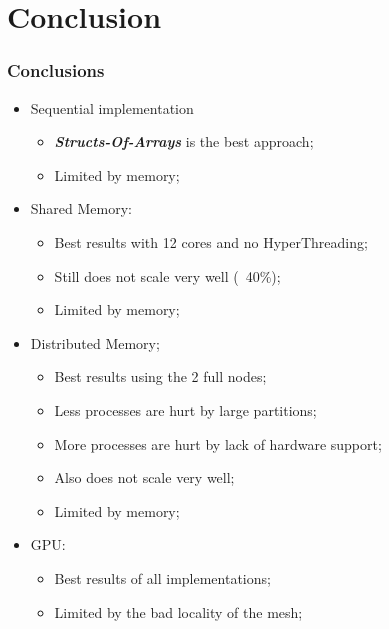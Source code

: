 \section{Conclusion}

\begin{frame}
	\frametitle{Conclusions}

	\begin{itemize}
		\item Sequential implementation
		\begin{itemize}
			\item \textbf{\itshape Structs-Of-Arrays} is the best approach;
			\item Limited by memory;
		\end{itemize}
		\item Shared Memory:
		\begin{itemize}
			\item Best results with 12 cores and no HyperThreading;
			\item Still does not scale very well (~40\%);
			\item Limited by memory;
		\end{itemize}
		\item Distributed Memory;
		\begin{itemize}
			\item Best results using the 2 full nodes;
			\item Less processes are hurt by large partitions;
			\item More processes are hurt by lack of hardware support;
			\item Also does not scale very well;
			\item Limited by memory;
		\end{itemize}
		\item GPU:
		\begin{itemize}
			\item Best results of all implementations;
			\item Limited by the bad locality of the mesh;
		\end{itemize}
	\end{itemize}
\end{frame}

